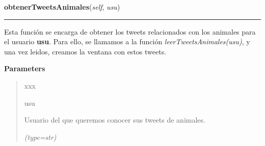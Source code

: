     \vspace{0.5ex}

\hspace{.8\funcindent}\begin{boxedminipage}{\funcwidth}

    \raggedright \textbf{obtenerTweetsAnimales}(\textit{self}, \textit{usu})

    \vspace{-1.5ex}

    \rule{\textwidth}{0.5\fboxrule}
\setlength{\parskip}{2ex}
    Esta función se encarga de obtener los tweets relacionados con los 
    animales para el usuario \textbf{usu}. Para ello, se llamamos a la 
    función \textit{leerTweetsAnimales(usu)}, y una vez leidos, creamos la 
    ventana con estos tweets.

\setlength{\parskip}{1ex}
      \textbf{Parameters}
      \vspace{-1ex}

      \begin{quote}
        \begin{Ventry}{xxx}

          \item[usu]

          Usuario del que queremos conocer sus tweets de animales.

            {\it (type=str)}

        \end{Ventry}

      \end{quote}

    \end{boxedminipage}

    \label{funcionesTwitter:FuncionesTwitter:leerTweetsAnimales}

    \vspace{0.5ex}

